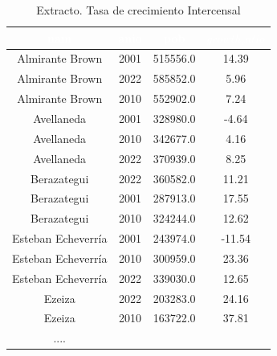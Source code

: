 \documentclass{article}
\theoremstyle{mytheoremstyle}
\theoremstyle{mytheoremstyle}
\theoremstyle{myproblemstyle}
\begin{document}
  \begin{table}[htb]
    \centering
    \begin{tabular}{|c|c|c|c|}
    \hline
    \textbf{\cellcolor[rgb]{0,0.231,0.427}\textcolor{white}{nam}} &
     \textbf{\cellcolor[rgb]{0,0.231,0.427}\textcolor{white}{anio}}
      & \textbf{\cellcolor[rgb]{0,0.231,0.427}\textcolor{white}{pob}}
       & \textbf{\cellcolor[rgb]{0,0.231,0.427}\textcolor{white}{$growth_ratio$}} \\ \hline
    Almirante Brown & 2001 & 515556.0 & 14.39 \\
    Almirante Brown & 2022 & 585852.0 & 5.96 \\
    Almirante Brown & 2010 & 552902.0 & 7.24 \\
    Avellaneda & 2001 & 328980.0 & -4.64 \\
    Avellaneda & 2010 & 342677.0 & 4.16 \\
    Avellaneda & 2022 & 370939.0 & 8.25 \\
    Berazategui & 2022 & 360582.0 & 11.21 \\
    Berazategui & 2001 & 287913.0 & 17.55 \\
    Berazategui & 2010 & 324244.0 & 12.62 \\
    Esteban Echeverría & 2001 & 243974.0 & -11.54 \\
    Esteban Echeverría & 2010 & 300959.0 & 23.36 \\
    Esteban Echeverría & 2022 & 339030.0 & 12.65 \\
    Ezeiza & 2022 & 203283.0 & 24.16 \\
    Ezeiza & 2010 & 163722.0 & 37.81 \\
    ....& & & \\
  
    \hline
    \end{tabular}
    \caption{Extracto. Tasa de crecimiento Intercensal}
  \label{tab:RatiosAll}
    \end{table}
  
\end{document}
